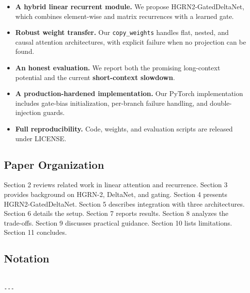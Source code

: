 \begin{itemize}
\item \textbf{A hybrid linear recurrent module.} We propose HGRN2-GatedDeltaNet,
  which combines element-wise and matrix recurrences with a learned gate.
\item \textbf{Robust weight transfer.} Our \texttt{copy\_weights} handles flat, nested, and
  causal attention architectures, with explicit failure when no projection
  can be found.
\item \textbf{An honest evaluation.} We report both the promising long-context potential
  and the current \textbf{short-context slowdown}.
\item \textbf{A production-hardened implementation.} Our PyTorch implementation
  includes gate-bias initialization, per-branch failure handling, and
  double-injection guards.
\item \textbf{Full reproducibility.} Code, weights, and evaluation scripts are
  released under {{LICENSE}}.

\end{itemize}
\subsection{Paper Organization}

Section 2 reviews related work in linear attention and recurrence. Section 3 
provides background on HGRN-2, DeltaNet, and gating. Section 4 presents 
HGRN2-GatedDeltaNet. Section 5 describes integration with three architectures. 
Section 6 details the setup. Section 7 reports results. Section 8 analyzes 
the trade-offs. Section 9 discusses practical guidance. Section 10 lists 
limitations. Section 11 concludes.



\subsection{Notation}

\begin{lstlisting}

---
\end{lstlisting}